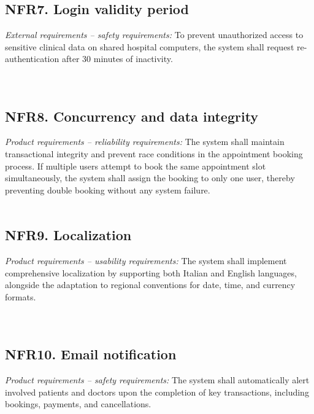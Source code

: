 \documentclass[12pt, a4paper]{article}
\begin{document}
\subsection{NFR7. Login validity period} \label{NFR7}
    \textit{External requirements -- safety requirements:}
    To prevent unauthorized access to sensitive clinical data on shared hospital computers, the system shall request re-authentication after 30 minutes of inactivity.
    \\ 
    \\ 
    \\ 
    

\subsection{NFR8. Concurrency and data integrity} \label{NFR8}
    \textit{Product requirements -- reliability requirements:}
    The system shall maintain transactional integrity and prevent race conditions in the appointment booking process. If multiple users attempt to book the same appointment slot simultaneously, the system shall assign the booking to only one user, thereby preventing double booking without any system failure.
    \\ 
    \\ 
    

\subsection{NFR9. Localization} \label{NFR9}
\textit{Product requirements -- usability requirements:}
The system shall implement comprehensive localization by supporting both Italian and English languages, alongside the adaptation to regional conventions for date, time, and currency formats.
\\ 
\\ 
\\ 

\subsection{NFR10. Email notification}\label{NFR10}
\textit{Product requirements -- safety requirements:}
The system shall automatically alert involved patients and doctors upon the completion of key transactions, including bookings, payments, and cancellations. 
 \\ 
 \\ 
 \\ 
 \\ 
 \\ 
 \\ 
 \\ 
 
\end{document}
